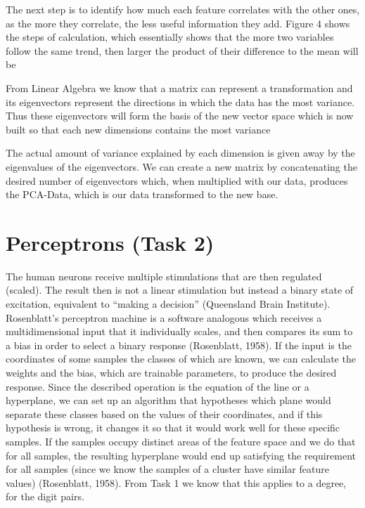 \documentclass{article}
\begin{document}
The next step is to identify how much each feature correlates with the other ones, as the more they correlate, the less useful information they add.
Figure 4 shows the steps of calculation, which essentially shows that the more two variables follow the same trend, then larger the product of their difference to the mean will be

From Linear Algebra we know that a matrix can represent a transformation and its eigenvectors represent the directions in which the data has the most variance.
Thus these eigenvectors will form the basis of the new vector space which is now built so that each new dimensions contains the most variance

The actual amount of variance explained by each dimension is given away by the eigenvalues of the eigenvectors.
We can create a new matrix by concatenating the desired number of eigenvectors which, when multiplied with our data, produces the PCA-Data, which is our data transformed to the new base. 

\section{Perceptrons (Task 2)}

The human neurons receive multiple stimulations that are then regulated (scaled).
The result then is not a linear stimulation but instead a binary state of excitation, equivalent to “making a decision” (Queensland Brain Institute).
Rosenblatt’s perceptron machine is a software analogous which receives a multidimensional input that it individually scales, and then compares its sum to a bias in order to select a binary response (Rosenblatt, 1958).
If the input is the coordinates of some samples the classes of which are known, we can calculate the weights and the bias, which are trainable parameters, to produce the desired response.
Since the described operation is the equation of the line or a hyperplane, we can set up an algorithm that hypotheses which plane would separate these classes based on the values of their coordinates, and if this hypothesis is wrong, it changes it so that it would work well for these specific samples.
If the samples occupy distinct areas of the feature space and we do that for all samples, the resulting hyperplane would end up satisfying the requirement for all samples (since we know the samples of a cluster have similar feature values) (Rosenblatt, 1958).
From Task 1 we know that this applies to a degree, for the digit pairs.
\end{document}
